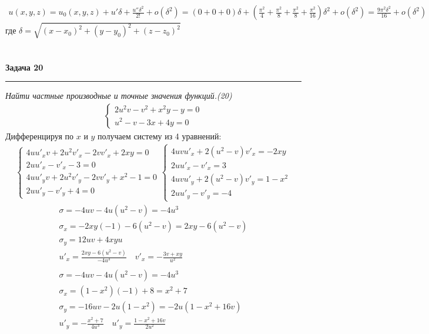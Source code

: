 \documentclass[a4paper,11pt]{article}
\begin{document}
\begin{gather*}
u(x, y, z) = u_0(x, y, z) + u'\delta + \frac{u''\delta^2}{2!} + o(\delta^2) = 
(0 + 0 + 0)\delta + (\frac{\pi^2}{4} + \frac{\pi^2}{8} + \frac{\pi^2}{8} + \frac{\pi^2}{16})\delta^2 + o(\delta^2) = \frac{9\pi^2\delta^2}{16} + o(\delta^2)
\end{gather*}
где $ \delta = \sqrt{(x - x_0)^2 + (y - y_0)^2 + (z - z_0)^2} $
\\ \\ \\





\textbf{\large Задача 20}
\medskip\hrule\medskip
\textit{Найти частные производные и точные значения функций.(20) }
\begin{gather*}
\begin{cases}
2u^2v - v^2 + x^2y - y = 0 \\[2pt]
u^2 - v - 3x + 4y = 0
\end{cases}
\end{gather*}
Дифференцируя по $ x $ и $ y $ получаем систему из 4 уравнений:
\begin{gather*}
\begin{cases}
4uu'_xv + 2u^2v'_x - 2vv'_x + 2xy = 0 \\[2pt]
2uu'_x - v'_x - 3 = 0 \\[2pt]
4uu'_yv + 2u^2v'_y - 2vv'_y + x^2 - 1 = 0 \\[2pt]
2uu'_y - v'_y + 4 = 0
\end{cases}
\begin{cases}
4uvu'_x + 2(u^2  - v)v'_x  = -2xy\\[2pt]
2uu'_x - v'_x = 3 \\[2pt]
4uvu'_y + 2(u^2 - v)v'_y = 1 - x^2 \\[2pt]
2uu'_y - v'_y = -4
\end{cases}
\end{gather*}
\begin{gather*}
\sigma = -4uv - 4u(u^2 - v) = -4u^3 \\[2pt]
\sigma_x = -2xy(-1) - 6(u^2 - v) = 2xy - 6(u^2 - v) \\[2pt] 
\sigma_y = 12uv  + 4xyu  \\[2pt]
u'_x = \frac{2xy - 6(u^2 - v)}{-4u^3} \quad v'_x = -\frac{3v  + xy}{u^2}
\\ \\
\sigma = -4uv - 4u(u^2 - v) = -4u^3 \\[2pt]
\sigma_x = (1 - x^2)(-1) + 8 = x^2 + 7 \\[2pt]
\sigma_y = -16uv  - 2u(1 - x^2) = -2u(1 - x^2 + 16v) \\[2pt]
u'_y = -\frac{x^2 + 7}{4u^3} \quad u'_y = \frac{1 - x^2 + 16v}{2u^2} 
\end{gather*}
\end{document}
